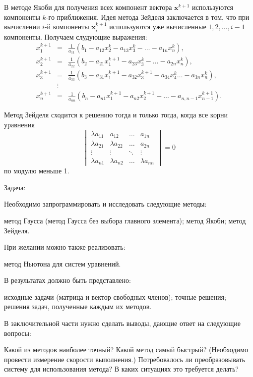 В методе Якоби для получения всех компонент вектора $\mathbf{x}^{k+1}$
используются компоненты $k$-го приближения. Идея метода Зейделя заключается
в том, что при вычислении $i$-й компоненты $\mathbf{x}_{i}^{k+1}$
используются уже вычисленные $1,2,\ldots,i-1$ компоненты. Получаем
слудующие выражения:
\begin{eqnarray*}
x_{1}^{k+1} & = & \frac{1}{a_{11}}\left(b_{1}-a_{12}x_{2}^{k}-a_{13}x_{3}^{k}-\ldots-a_{1n}x_{n}^{k}\right),\\
x_{2}^{k+1} & = & \frac{1}{a_{22}}\left(b_{2}-a_{21}x_{1}^{k+1}-a_{23}x_{3}^{k}-\ldots-a_{2n}x_{n}^{k}\right),\\
x_{3}^{k+1} & = & \frac{1}{a_{33}}\left(b_{3}-a_{31}x_{1}^{k+1}-a_{32}x_{3}^{k+1}-a_{34}x_{4}^{k}\ldots-a_{3n}x_{n}^{k}\right),\\
 & \vdots\\
x_{n}^{k+1} & = & \frac{1}{a_{nn}}\left(b_{n}-a_{n1}x_{1}^{k+1}-a_{n2}x_{2}^{k+1}-\ldots-a_{n,n-1}x_{n-1}^{k+1}\right).
\end{eqnarray*}

\begin{thm}
Метод Зейделя сходится к решению тогда и только тогда, когда все корни
уравнения \textup{
\[
\begin{vmatrix}\lambda a_{11} & a_{12} & \ldots & a_{1n}\\
\lambda a_{21} & \lambda a_{22} & \ldots & a_{2n}\\
\vdots & \vdots & \ddots & \vdots\\
\lambda a_{n1} & \lambda a_{n2} & \ldots & \lambda a_{nn}
\end{vmatrix}=0
\]
}по модулю меньше 1.
\end{thm}

\Practice

\Tasks
Задача:

Необходимо запрограммировать и исследовать следующие методы:

метод Гаусса (метод Гаусса без выбора главного элемента); метод Якоби;
метод Зейделя.

При желании можно также реализовать:

метод Ньютона для систем уравнений.

В результатах должно быть представлено:

исходные задачи (матрица и вектор свободных членов); точные решения;
решения задач, полученные каждым их методов.

В заключительной части нужно сделать выводы, дающие ответ на следующие
вопросы:

Какой из методов наиболее точный? Какой метод самый быстрый? (Необходимо
провести измерение скорости выполнения.) Потребовалось ли преобразовывать
систему для использования метода? В каких ситуациях это требуется
делать?

\Questions
